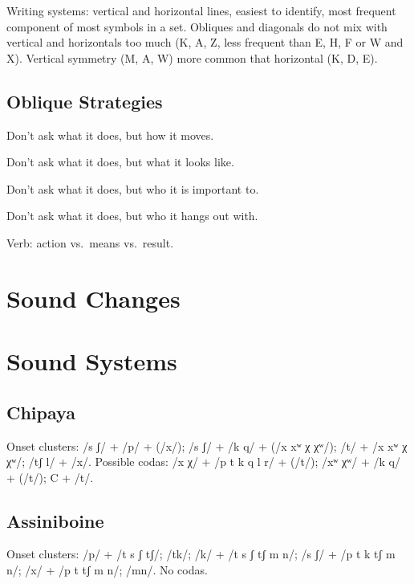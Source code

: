 \documentclass[11pt]{article}
\begin{document}
Writing systems: vertical and horizontal lines, easiest to identify,
most frequent component of most symbols in a set. Obliques and
diagonals do not mix with vertical and horizontals too much (K, A, Z,
less frequent than E, H, F or W and X). Vertical symmetry (M, A, W)
more common that horizontal (K, D, E).

\subsection{Oblique Strategies}
Don't ask what it does, but how it moves.

Don't ask what it does, but what it looks like.

Don't ask what it does, but who it is important to.

Don't ask what it does, but who it hangs out with.

Verb: action vs.\ means vs.\ result.

\section{Sound Changes}
{\small

}

\section{Sound Systems}

\subsection{Chipaya} Onset clusters: /s ʃ/ + /p/ + (/x/); /s ʃ/ + /k q/ +
(/x xʷ χ χʷ/); /t/ + /x xʷ χ χʷ/; /tʃ l/ + /x/.  Possible codas: /x χ/
+ /p t k q l r/ + (/t/); /xʷ χʷ/ + /k q/ + (/t/); C + /t/. 

\subsection{Assiniboine} Onset clusters: /p/ + /t s ʃ tʃ/; /tk/; /k/ +
/t s ʃ tʃ m n/; /s ʃ/ + /p t k tʃ m n/; /x/ + /p t tʃ m n/; /mn/.  No
codas. 
\end{document}
